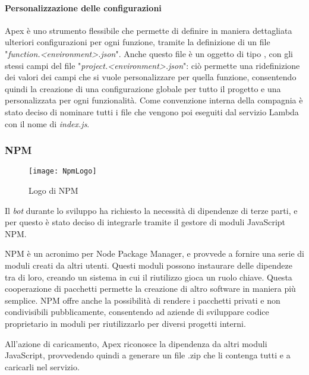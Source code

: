 \paragraph*{Personalizzazione delle configurazioni} Apex è uno strumento
flessibile che permette di definire in maniera dettagliata ulteriori
configurazioni per ogni funzione, tramite la definizione di un file
"\textit{function.<environment>.json}". Anche questo file è un oggetto di tipo
, con gli stessi campi del file
"\textit{project.<environment>.json}": ciò permette una ridefinizione dei valori
dei campi che si vuole personalizzare per quella funzione, consentendo quindi
la creazione di una configurazione globale per tutto il progetto e una
personalizzata per ogni funzionalità.
Come convenzione interna della compagnia è stato deciso di nominare tutti i
file che vengono poi eseguiti dal servizio Lambda con il nome di
\textit{index.js}.

\newpage

\subsubsection{NPM}
\begin{figure}[H]
  \centering
  \texttt{[image: NpmLogo]}
  \caption{Logo di NPM}
\end{figure}

Il \textit{bot} durante lo sviluppo ha richiesto la
necessità di dipendenze di terze parti, e per questo è stato deciso di
integrarle tramite il gestore di moduli JavaScript NPM.

NPM è un acronimo per Node Package Manager, e provvede a fornire una serie di
moduli creati da altri utenti. Questi moduli possono instaurare delle dipendeze
tra di loro, creando un sistema in cui il riutilizzo gioca un ruolo chiave.
Questa cooperazione di pacchetti permette la creazione di altro software in
maniera più semplice.
NPM offre anche la possibilità di rendere i pacchetti privati e non
condivisibili pubblicamente, consentendo ad aziende di sviluppare codice
proprietario in moduli per riutilizzarlo per diversi progetti interni.

All'azione di caricamento, Apex riconosce la dipendenza da altri moduli
JavaScript, provvedendo quindi a generare un file .zip che li contenga tutti e
a caricarli nel servizio.

